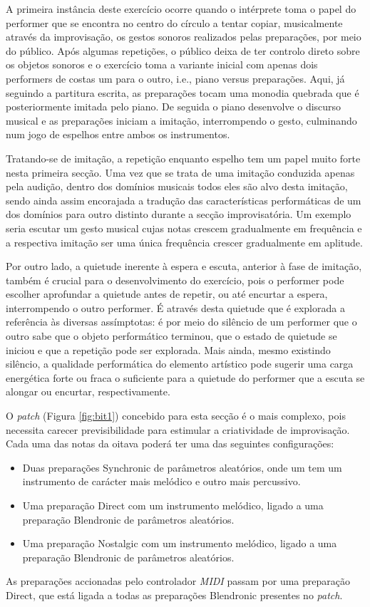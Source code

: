 \documentclass[../main.tex]{subfiles}
\begin{document}
A primeira instância deste exercício ocorre quando o intérprete toma o papel do performer que se encontra no centro do círculo a tentar copiar, musicalmente através da improvisação, os gestos sonoros realizados pelas preparações, por meio do público. Após algumas repetições, o público deixa de ter controlo direto sobre os objetos sonoros e o exercício toma a variante inicial com apenas dois performers de costas um para o outro, i.e., piano versus preparações. Aqui, já seguindo a partitura escrita, as preparações tocam uma monodia quebrada que é posteriormente imitada pelo piano. De seguida o piano desenvolve o discurso musical e as preparações iniciam a imitação, interrompendo o gesto, culminando num jogo de espelhos entre ambos os instrumentos.

Tratando-se de imitação, a repetição enquanto espelho tem um papel muito forte nesta primeira secção. Uma vez que se trata de uma imitação conduzida apenas pela audição, dentro dos domínios musicais todos eles são alvo desta imitação, sendo ainda assim encorajada a tradução das características performáticas de um dos domínios para outro distinto durante a secção improvisatória. Um exemplo seria escutar um gesto musical cujas notas crescem gradualmente em frequência e a respectiva imitação ser uma única frequência crescer gradualmente em aplitude.

Por outro lado, a quietude inerente à espera e escuta, anterior à fase de imitação, também é crucial para o desenvolvimento do exercício, pois o performer pode escolher aprofundar a quietude antes de repetir, ou até encurtar a espera, interrompendo o outro performer. É através desta quietude que é explorada a referência às diversas assímptotas: é por meio do silêncio de um performer que o outro sabe que o objeto performático terminou, que o estado de quietude se iniciou e que a repetição pode ser explorada. Mais ainda, mesmo existindo silêncio, a qualidade performática do elemento artístico pode sugerir uma carga energética forte ou fraca o suficiente para a quietude do performer que a escuta se alongar ou encurtar, respectivamente.

O \textsl{patch} (Figura \ref{fig:bit1}) concebido para esta secção é o mais complexo, pois necessita carecer previsibilidade para estimular a criatividade de improvisação. Cada uma das notas da oitava poderá ter uma das seguintes configurações:
\begin{itemize}
    \item Duas preparações Synchronic de parâmetros aleatórios, onde um tem um instrumento de carácter mais melódico e outro mais percussivo.
    \item Uma preparação Direct com um instrumento melódico, ligado a uma preparação Blendronic de parâmetros aleatórios.
    \item Uma preparação Nostalgic com um instrumento melódico, ligado a uma preparação Blendronic de parâmetros aleatórios.
\end{itemize}
As preparações accionadas pelo controlador \textsl{MIDI} passam por uma preparação Direct, que está ligada a todas as preparações Blendronic presentes no \textsl{patch}.
\end{document}
